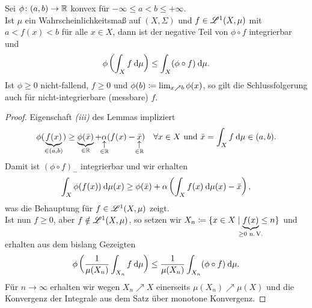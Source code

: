\documentclass[skript.tex]{subfiles}
\begin{document}
	\begin{theorem}[Jensen]
		Sei $\phi \colon (a,b) \to \mathbb{R}$ konvex für $-\infty \leq a<b \leq +\infty$.\\
		Ist $\mu$ ein Wahrscheinlichkeitsmaß auf $(X,\Sigma)$ und $f \in \mathscr{L}^1(X,\mu)$ mit $a<f(x)<b$ für alle $x \in X$, dann ist der negative Teil von $\phi \circ f$ integrierbar und
		\[
			\phi\left(\int_X f \: \mathrm{d}\mu\right) \leq \int_X (\phi \circ f) \: \mathrm{d}\mu.
		\]
		Ist $\phi \geq 0$ nicht-fallend, $f \geq 0$ und $\phi(b) \coloneqq \lim_{x \nearrow b} \phi(x)$, so gilt die Schlussfolgerung auch für nicht-integrierbare (messbare) $f$.
	\end{theorem}
	\begin{proof}
		Eigenschaft \emph{(iii)} des Lemmas impliziert
		\[
			\phi(\underbrace{f(x)}_{\in(a,b)}) \geq
			\underbrace{\phi(\bar{x})}_{\in\mbb{R}} +
			\uarrow{\in\mbb{R}}{\alpha}(f(x)-\uarrow{\in\mbb{R}}{\bar{x}}) \quad \forall x \in X \text{ und } \bar{x} = \int_X f \md\mu \in(a,b).
		\]
		Damit ist $(\phi \circ f)_-$ integrierbar und wir erhalten
		\[
			\int_X \phi(f(x)) \: \mathrm{d}\mu(x) \geq \phi(\bar{x}) + \alpha \left( \int_X f(x) \: \mathrm{d}\mu(x) - \bar{x} \right),
		\]
		was die Behauptung für $f \in \mathscr{L}^1(X,\mu)$ zeigt.\\
		Ist nun $f \geq 0$, aber $f \notin \mathscr{L}^1(X,\mu)$, so setzen wir $X_n \ceq \{x \in X \mid \underbrace{f(x)}_{\mathclap{\geq 0 \text{ n.\,V.}}} \leq n \}$ und erhalten aus dem bislang Gezeigten
		\[
			\phi\left(\frac{1}{\mu(X_n)} \int_{X_n} f \: \mathrm{d}\mu\right)
			\leq \frac{1}{\mu(X_n)} \int_{X_n} (\phi \circ f) \: \mathrm{d}\mu.
		\]
		Für $n \to \infty$ erhalten wir wegen $X_n \nearrow X$ einerseits $\mu(X_n) \nearrow \mu(X)$ und die Konvergenz der Integrale aus dem Satz über monotone Konvergenz.
	\end{proof}
	
\end{document}
